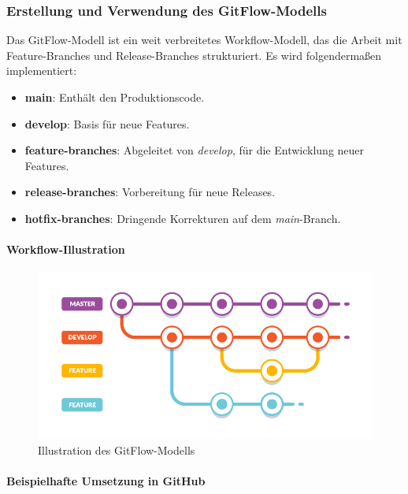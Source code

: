 \subsubsection{Erstellung und Verwendung des GitFlow-Modells}

Das GitFlow-Modell ist ein weit verbreitetes Workflow-Modell, das die Arbeit mit Feature-Branches und Release-Branches strukturiert. Es wird folgendermaßen implementiert:

\begin{itemize}
    \item \textbf{main}: Enthält den Produktionscode.
    \item \textbf{develop}: Basis für neue Features.
    \item \textbf{feature-branches}: Abgeleitet von \textit{develop}, für die Entwicklung neuer Features.
    \item \textbf{release-branches}: Vorbereitung für neue Releases.
    \item \textbf{hotfix-branches}: Dringende Korrekturen auf dem \textit{main}-Branch.
\end{itemize}

\paragraph{Workflow-Illustration}

\begin{figure}[h!]
\centering
\includegraphics[width=\textwidth]{img/gitflow_workflow.png}
\caption{Illustration des GitFlow-Modells}
\label{fig:gitflow}
\end{figure}

\paragraph{Beispielhafte Umsetzung in GitHub}

